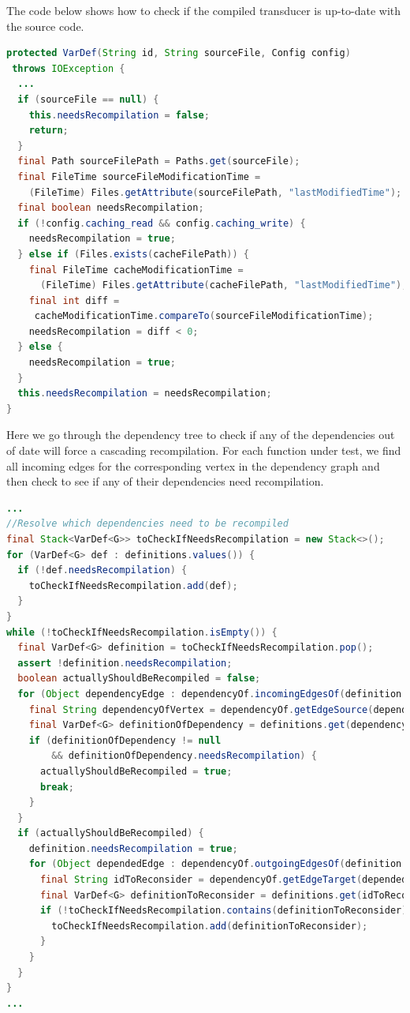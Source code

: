 The code below shows how to check if the compiled transducer is
up-to-date with the source code.

\begin{lstlisting}[language=Java]
protected VarDef(String id, String sourceFile, Config config)
 throws IOException {
  ...
  if (sourceFile == null) {
    this.needsRecompilation = false;
    return;
  }
  final Path sourceFilePath = Paths.get(sourceFile);
  final FileTime sourceFileModificationTime =
    (FileTime) Files.getAttribute(sourceFilePath, "lastModifiedTime");
  final boolean needsRecompilation;
  if (!config.caching_read && config.caching_write) {
    needsRecompilation = true;
  } else if (Files.exists(cacheFilePath)) {
    final FileTime cacheModificationTime =
      (FileTime) Files.getAttribute(cacheFilePath, "lastModifiedTime");
    final int diff =
     cacheModificationTime.compareTo(sourceFileModificationTime);
    needsRecompilation = diff < 0;
  } else {
    needsRecompilation = true;
  }
  this.needsRecompilation = needsRecompilation;
}
\end{lstlisting}

Here we go through the dependency tree to check if any of the
dependencies out of date will force a cascading recompilation. 
For each function under test, we find all incoming edges for
the corresponding vertex in the dependency graph and then check
to see if any of their dependencies need recompilation.
\begin{lstlisting}[language=Java]
...
//Resolve which dependencies need to be recompiled
final Stack<VarDef<G>> toCheckIfNeedsRecompilation = new Stack<>();
for (VarDef<G> def : definitions.values()) {
  if (!def.needsRecompilation) {
    toCheckIfNeedsRecompilation.add(def);
  }
}
while (!toCheckIfNeedsRecompilation.isEmpty()) {
  final VarDef<G> definition = toCheckIfNeedsRecompilation.pop();
  assert !definition.needsRecompilation;
  boolean actuallyShouldBeRecompiled = false;
  for (Object dependencyEdge : dependencyOf.incomingEdgesOf(definition.id)) {
    final String dependencyOfVertex = dependencyOf.getEdgeSource(dependencyEdge);
    final VarDef<G> definitionOfDependency = definitions.get(dependencyOfVertex);
    if (definitionOfDependency != null
        && definitionOfDependency.needsRecompilation) {
      actuallyShouldBeRecompiled = true;
      break;
    }
  }
  if (actuallyShouldBeRecompiled) {
    definition.needsRecompilation = true;
    for (Object dependedEdge : dependencyOf.outgoingEdgesOf(definition.id)) {
      final String idToReconsider = dependencyOf.getEdgeTarget(dependedEdge);
      final VarDef<G> definitionToReconsider = definitions.get(idToReconsider);
      if (!toCheckIfNeedsRecompilation.contains(definitionToReconsider)) {
        toCheckIfNeedsRecompilation.add(definitionToReconsider);
      }
    }
  }
}
...
\end{lstlisting}

